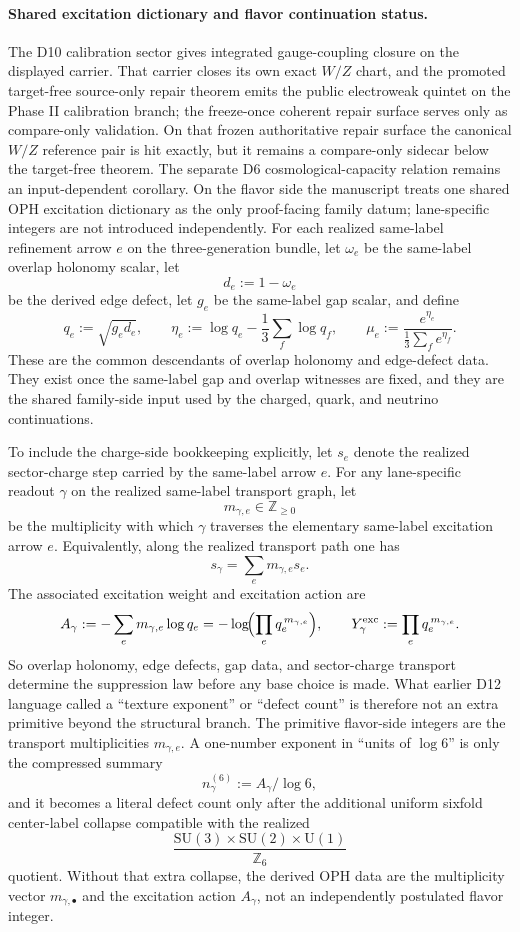 \documentclass[11pt]{article}
\newcommand{\SU}{\mathrm{SU}}
\newcommand{\U}{\mathrm{U}}
\begin{document}
\paragraph{Shared excitation dictionary and flavor continuation status.}
The D10 calibration sector gives integrated gauge-coupling closure on the displayed carrier. That carrier closes its own exact \(W/Z\) chart, and the promoted target-free source-only repair theorem emits the public electroweak quintet on the Phase II calibration branch; the freeze-once coherent repair surface serves only as compare-only validation. On that frozen authoritative repair surface the canonical \(W/Z\) reference pair is hit exactly, but it remains a compare-only sidecar below the target-free theorem. The separate D6 cosmological-capacity relation remains an input-dependent corollary. On the flavor side the manuscript treats one shared OPH excitation dictionary as the only proof-facing family datum; lane-specific integers are not introduced independently. For each realized same-label refinement arrow \(e\) on the three-generation bundle, let \(\omega_e\) be the same-label overlap holonomy scalar, let
\[
d_e:=1-\omega_e
\]
be the derived edge defect, let \(g_e\) be the same-label gap scalar, and define
\[
q_e:=\sqrt{g_e d_e},
\qquad
\eta_e:=\log q_e-\frac13\sum_f \log q_f,
\qquad
\mu_e:=\frac{e^{\eta_e}}{\frac13\sum_f e^{\eta_f}}.
\]
These are the common descendants of overlap holonomy and edge-defect data. They exist once the same-label gap and overlap witnesses are fixed, and they are the shared family-side input used by the charged, quark, and neutrino continuations.

To include the charge-side bookkeeping explicitly, let \(s_e\) denote the realized sector-charge step carried by the same-label arrow \(e\). For any lane-specific readout \(\gamma\) on the realized same-label transport graph, let
\[
m_{\gamma,e}\in\mathbb Z_{\ge 0}
\]
be the multiplicity with which \(\gamma\) traverses the elementary same-label excitation arrow \(e\). Equivalently, along the realized transport path one has
\[
s_\gamma=\sum_e m_{\gamma,e}s_e.
\]
The associated excitation weight and excitation action are
\[
A_\gamma
:=
-\sum_e m_{\gamma,e}\log q_e
=
-\log\!\Bigl(\prod_e q_e^{\,m_{\gamma,e}}\Bigr),
\qquad
Y_\gamma^{\mathrm{exc}}
:=
\prod_e q_e^{\,m_{\gamma,e}}.
\]
So overlap holonomy, edge defects, gap data, and sector-charge transport determine the suppression law before any base choice is made. What earlier D12 language called a ``texture exponent'' or ``defect count'' is therefore not an extra primitive beyond the structural branch. The primitive flavor-side integers are the transport multiplicities \(m_{\gamma,e}\). A one-number exponent in ``units of \(\log 6\)'' is only the compressed summary
\[
n_\gamma^{(6)}:=A_\gamma/\log 6,
\]
and it becomes a literal defect count only after the additional uniform sixfold center-label collapse compatible with the realized
\[
\frac{\SU(3)\times\SU(2)\times\U(1)}{\mathbb Z_6}
\]
quotient. Without that extra collapse, the derived OPH data are the multiplicity vector \(m_{\gamma,\bullet}\) and the excitation action \(A_\gamma\), not an independently postulated flavor integer.
\end{document}
